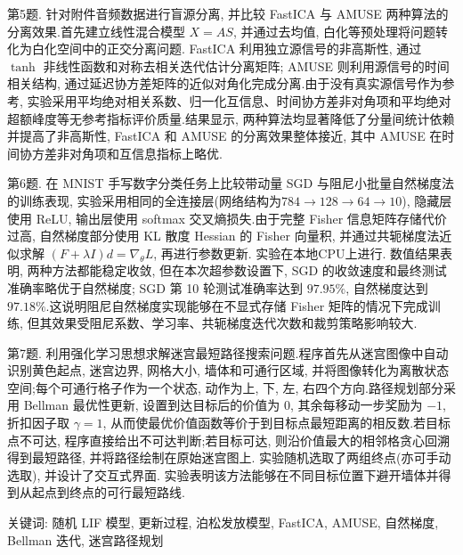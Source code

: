 ﻿\documentclass[UTF8,  zihao=-4]{ctexart}
\begin{document}
\begin{titlepage}
第5题. 针对附件音频数据进行盲源分离, 并比较 FastICA 与 AMUSE 两种算法的分离效果.首先建立线性混合模型 \(X=AS\), 并通过去均值, 白化等预处理将问题转化为白化空间中的正交分离问题. FastICA 利用独立源信号的非高斯性, 通过 \(\tanh\) 非线性函数和对称去相关迭代估计分离矩阵; AMUSE 则利用源信号的时间相关结构, 通过延迟协方差矩阵的近似对角化完成分离.由于没有真实源信号作为参考, 实验采用平均绝对相关系数、归一化互信息、时间协方差非对角项和平均绝对超额峰度等无参考指标评价质量.结果显示, 两种算法均显著降低了分量间统计依赖并提高了非高斯性,  FastICA 和 AMUSE 的分离效果整体接近, 其中 AMUSE 在时间协方差非对角项和互信息指标上略优.

第6题. 在 MNIST 手写数字分类任务上比较带动量 SGD 与阻尼小批量自然梯度法的训练表现, 实验采用相同的全连接层(网络结构为\(784\to128\to64\to10\)), 隐藏层使用 ReLU, 输出层使用 softmax 交叉熵损失.由于完整 Fisher 信息矩阵存储代价过高, 自然梯度部分使用 KL 散度 Hessian 的 Fisher 向量积, 并通过共轭梯度法近似求解 \((F+\lambda I)d=\nabla_\theta L\), 再进行参数更新. 实验在本地CPU上进行. 数值结果表明, 两种方法都能稳定收敛, 但在本次超参数设置下,  SGD 的收敛速度和最终测试准确率略优于自然梯度; SGD 第 10 轮测试准确率达到 \(97.95\%\), 自然梯度达到 \(97.18\%\).这说明阻尼自然梯度实现能够在不显式存储 Fisher 矩阵的情况下完成训练, 但其效果受阻尼系数、学习率、共轭梯度迭代次数和裁剪策略影响较大.

第7题. 利用强化学习思想求解迷宫最短路径搜索问题.程序首先从迷宫图像中自动识别黄色起点, 迷宫边界, 网格大小, 墙体和可通行区域, 并将图像转化为离散状态空间;每个可通行格子作为一个状态, 动作为上, 下, 左, 右四个方向.路径规划部分采用 Bellman 最优性更新, 设置到达目标后的价值为 \(0\), 其余每移动一步奖励为 \(-1\), 折扣因子取 \(\gamma=1\), 从而使最优价值函数等价于到目标点最短距离的相反数.若目标点不可达, 程序直接给出不可达判断;若目标可达, 则沿价值最大的相邻格贪心回溯得到最短路径, 并将路径绘制在原始迷宫图上. 实验随机选取了两组终点(亦可手动选取), 并设计了交互式界面. 实验表明该方法能够在不同目标位置下避开墙体并得到从起点到终点的可行最短路线.

\vspace{1.2em}

\noindent
{\heiti 关键词:} 随机 LIF 模型, 更新过程, 泊松发放模型, FastICA, AMUSE, 自然梯度, Bellman 迭代, 迷宫路径规划
\par
\endgroup

\end{titlepage}

\clearpage
\pagestyle{empty}
\tableofcontents
\clearpage
\pagestyle{fancy}
\setcounter{page}{1}
\end{document}
